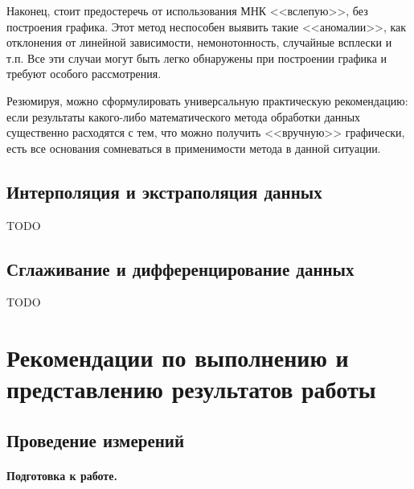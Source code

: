 \documentclass[10pt]{article}
\begin{document}
Наконец, стоит предостеречь от использования МНК <<вслепую>>,
без построения графика. Этот метод неспособен выявить такие <<аномалии>>,
как отклонения от линейной зависимости, немонотонность, случайные
всплески и т.п. Все эти случаи могут быть легко обнаружены при построении
графика и требуют особого рассмотрения.

Резюмируя, можно сформулировать универсальную практическую рекомендацию:
если результаты какого-либо математического метода обработки данных
существенно расходятся с тем, что можно получить <<вручную>>
графически, есть все основания сомневаться в применимости метода в
данной ситуации.

\subsection{Интерполяция и экстраполяция данных}

TODO

\subsection{Сглаживание и дифференцирование данных}

TODO

\section{Рекомендации по выполнению и представлению результатов работы}

\subsection{Проведение измерений}

\paragraph{Подготовка к работе.}
\end{document}
